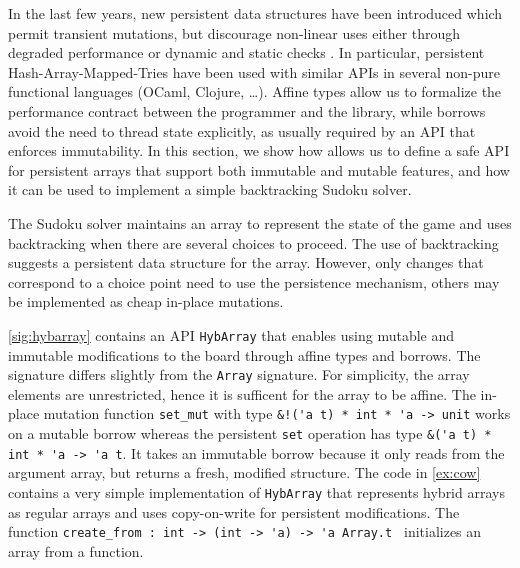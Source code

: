 In the last few years, new persistent data structures
have been introduced which permit transient mutations, but discourage
non-linear uses either through degraded performance
\cite{DBLP:conf/ml/ConchonF07} or
dynamic and static checks \cite{DBLP:journals/pacmpl/Puente17}.
In particular, persistent Hash-Array-Mapped-Tries have been used with similar
APIs in several non-pure functional languages (OCaml, Clojure, \dots).
Affine types allow us to formalize the performance contract between the programmer
and the library, while borrows avoid the need to thread state explicitly,
as usually required by an API that enforces immutability.
%
In this section, we show how \lang allows us to define
a safe API for persistent arrays that support both immutable and mutable features,
and how it can be used to implement a simple backtracking Sudoku solver.

The Sudoku solver maintains an array to represent the state of
the game and uses backtracking when there are several choices to proceed.
The use of backtracking suggests a persistent data structure for the array.
However, only changes that correspond to a choice point need to use
the persistence mechanism, others may be implemented as
cheap in-place mutations.

\cref{sig:hybarray} contains an API \lstinline/HybArray/ 
that enables using mutable and immutable modifications to
the board through affine types and borrows.
The signature differs slightly from the \lstinline/Array/
signature. For simplicity, the array elements are unrestricted, 
hence it is sufficent for the array to be affine.
The in-place mutation function \lstinline/set_mut/ with type
\lstinline/&!('a t) * int * 'a -> unit/ works on a mutable borrow  whereas the persistent
\lstinline/set/ operation has type \lstinline/&('a t) * int * 'a -> 'a t/. It
takes an immutable borrow because it only reads from the
argument array, but returns a fresh,  modified structure.
The code in \cref{ex:cow} contains a very simple implementation of
\lstinline/HybArray/ that represents hybrid arrays
as regular arrays and uses copy-on-write for persistent
modifications. The function
\lstinline/create_from : int -> (int -> 'a) -> 'a Array.t /
initializes an array from a function.


